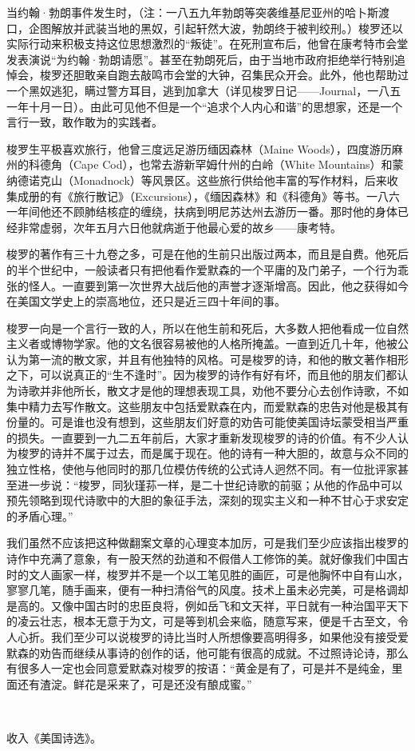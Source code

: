 \par 当约翰·勃朗事件发生时，（注：一八五九年勃朗等突袭维基尼亚州的哈卜斯渡口，企图解放并武装当地的黑奴，引起轩然大波，勃朗终于被判绞刑。）梭罗还以实际行动来积极支持这位思想激烈的“叛徒”。在死刑宣布后，他曾在康考特市会堂发表演说“为约翰·勃朗请愿”。甚至在勃朗死后，由于当地市政府拒绝举行特别追悼会，梭罗还胆敢亲自跑去敲鸣市会堂的大钟，召集民众开会。此外，他也帮助过一个黑奴逃犯，瞒过警方耳目，逃到加拿大（详见梭罗日记——Journal，一八五一年十月一日）。由此可见他不但是一个“追求个人内心和谐”的思想家，还是一个言行一致，敢作敢为的实践者。
\par 梭罗生平极喜欢旅行，他曾三度远足游历缅因森林（Maine Woods），四度游历麻州的科德角（Cape Cod），也常去游新罕姆什州的白岭（White Mountains）和蒙纳德诺克山（Monadnock）等风景区。这些旅行供给他丰富的写作材料，后来收集成册的有《旅行散记》（Excursions），《缅因森林》和《科德角》等书。一八六一年间他还不顾肺结核症的缠绕，扶病到明尼苏达州去游历一番。那时他的身体已经非常虚弱，次年五月六日他就病逝于他最心爱的故乡——康考特。
\par 梭罗的著作有三十九卷之多，可是在他的生前只出版过两本，而且是自费。他死后的半个世纪中，一般读者只有把他看作爱默森的一个平庸的及门弟子，一个行为乖张的怪人。一直要到第一次世界大战后他的声誉才逐渐增高。因此，他之获得如今在美国文学史上的崇高地位，还只是近三四十年间的事。
\par 梭罗一向是一个言行一致的人，所以在他生前和死后，大多数人把他看成一位自然主义者或博物学家。他的文名很容易被他的人格所掩盖。一直到近几十年，他被公认为第一流的散文家，并且有他独特的风格。可是梭罗的诗，和他的散文著作相形之下，可以说真正的“生不逢时”。因为梭罗的诗作有好有坏，而且他的朋友们都认为诗歌并非他所长，散文才是他的理想表现工具，劝他不要分心去创作诗歌，不如集中精力去写作散文。这些朋友中包括爱默森在内，而爱默森的忠告对他是极其有份量的。可是谁也没有想到，这些朋友们好意的劝告可能使美国诗坛蒙受相当严重的损失。一直要到一九二五年前后，大家才重新发现梭罗的诗的价值。有不少人认为梭罗的诗并不属于过去，而是属于现在。他的诗有一种大胆的，故意与众不同的独立性格，使他与他同时的那几位模仿传统的公式诗人迥然不同。有一位批评家甚至进一步说：“梭罗，同狄瑾荪一样，是二十世纪诗歌的前驱；从他的作品中可以预先领略到现代诗歌中的大胆的象征手法，深刻的现实主义和一种不甘心于求安定的矛盾心理。”
\par 我们虽然不应该把这种做翻案文章的心理变本加厉，可是我们至少应该指出梭罗的诗作中充满了意象，有一股天然的劲道和不假借人工修饰的美。就好像我们中国古时的文人画家一样，梭罗并不是一个以工笔见胜的画匠，可是他胸怀中自有山水，寥寥几笔，随手画来，便有一种扫清俗气的风度。技术上虽未必完美，可是格调却是高的。又像中国古时的忠臣良将，例如岳飞和文天祥，平日就有一种治国平天下的凌云壮志，根本无意于为文，可是等到机会来临，随意写来，便是千古至文，令人心折。我们至少可以说梭罗的诗比当时人所想像要高明得多，如果他没有接受爱默森的劝告而继续从事诗的创作的话，他可能有很高的成就。不过照诗论诗，那么有很多人一定也会同意爱默森对梭罗的按语：“黄金是有了，可是并不是纯金，里面还有渣淀。鲜花是采来了，可是还没有酿成蜜。”
\par  
\par *收入《美国诗选》。




